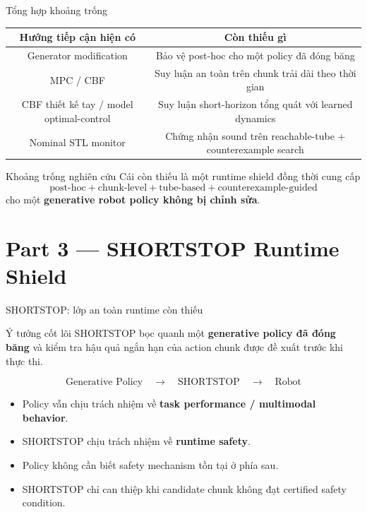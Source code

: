 \documentclass[aspectratio=169]{beamer}
\begin{document}
\begin{frame}[t,shrink=8]{Tổng hợp khoảng trống}
\begin{center}
\begin{tabular}{c|c}
\textbf{Hướng tiếp cận hiện có} & \textbf{Còn thiếu gì} \\ \hline

Generator modification
& Bảo vệ post-hoc cho một policy đã đóng băng \\[5pt]

MPC / CBF
& Suy luận an toàn trên chunk trải dài theo thời gian \\[5pt]

CBF thiết kế tay / model optimal-control
& Suy luận short-horizon tổng quát với learned dynamics \\[5pt]

Nominal STL monitor
& Chứng nhận sound trên reachable-tube + counterexample search
\end{tabular}
\end{center}
\vspace{8pt}

\begin{alertblock}{Khoảng trống nghiên cứu}
Cái còn thiếu là một runtime shield đồng thời cung cấp
\[
\boxed{
\text{post-hoc}
+
\text{chunk-level}
+
\text{tube-based}
+
\text{counterexample-guided}
}
\]
cho một \textbf{generative robot policy không bị chỉnh sửa}.
\end{alertblock}
\end{frame}

\section{Part 3 --- SHORTSTOP Runtime Shield}

\begin{frame}[t,shrink=8]{SHORTSTOP: lớp an toàn runtime còn thiếu}
\begin{block}{Ý tưởng cốt lõi}
SHORTSTOP bọc quanh một \textbf{generative policy đã đóng băng} và kiểm tra
hậu quả ngắn hạn của action chunk được đề xuất trước khi thực thi.
\end{block}
\vspace{6pt}
\begin{center}
\[\boxed{\text{Generative Policy}}\quad\longrightarrow\quad\boxed{\text{SHORTSTOP}}\quad\longrightarrow\quad\text{Robot}\]
\end{center}
\vspace{6pt}
\begin{itemize}
    \item Policy vẫn chịu trách nhiệm về \textbf{task performance / multimodal behavior}.
    \item SHORTSTOP chịu trách nhiệm về \textbf{runtime safety}.
    \item Policy không cần biết safety mechanism tồn tại ở phía sau.
    \item SHORTSTOP chỉ can thiệp khi candidate chunk không đạt certified safety condition.
\end{itemize}
\end{frame}
\end{document}
